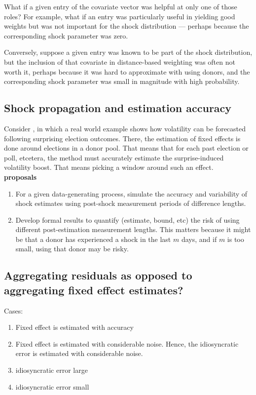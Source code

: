 \documentclass{uiucthesis2021}
\theoremstyle{definition}
\begin{document}
What if a given entry of the covariate vector was helpful at only one of those roles?  For example, what if an entry was particularly useful in yielding good weights but was not important for the shock distribution --- perhaps because the corresponding shock parameter was zero.  

Conversely, suppose a given entry was known to be part of the shock distribution, but the inclusion of that covariate in distance-based weighting was often not worth it, perhaps because it was hard to approximate with using donors, and the corresponding shock parameter was small in magnitude with high probability.

\subsection{Shock propagation and estimation accuracy}
Consider \cite{lundquist2024volatility}, in which a real world example shows how volatility can be forecasted following surprising election outcomes.  There, the estimation of fixed effects is done around elections in a donor pool.  That means that for each past election or poll, etcetera, the method must accurately estimate the surprise-induced volatility boost.  That means picking a window around such an effect.\\

\textbf{proposals}
\begin{enumerate}
  \item For a given data-generating process, simulate the accuracy and variability of shock estimates using post-shock measurement periods of difference lengths.
  \item Develop formal results to quantify (estimate, bound, etc) the risk of using different post-estimation measurement lengths.  This matters because it might be that a donor has experienced a shock in the last $m$ days, and if $m$ is too small, using that donor may be risky.
\end{enumerate}
    

\subsection{Aggregating residuals as opposed to aggregating fixed effect estimates?}

Cases:
\begin{enumerate}
  \item Fixed effect is estimated with accuracy 
  \item Fixed effect is estimated with considerable noise.  Hence, the idiosyncratic error is estimated with considerable noise.
  \item idiosyncratic error large
  \item idiosyncratic error small
\end{enumerate}  
\end{document}
